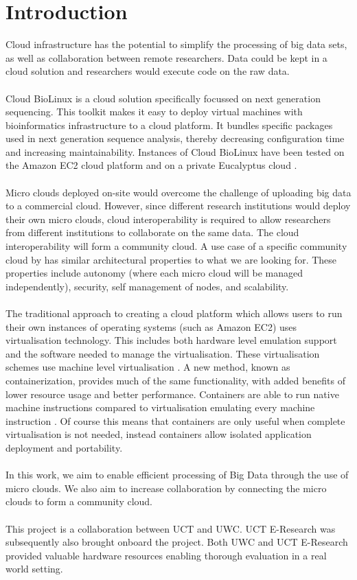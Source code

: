 \documentclass{sig-alternate-05-2015}
\begin{document}
\section{Introduction}
Cloud infrastructure has the potential to simplify the processing of big data sets, as well as collaboration between remote researchers. Data could be kept in a cloud solution and researchers would execute code on the raw data.
\\
\\
Cloud BioLinux is a cloud solution specifically focussed on next generation sequencing. This toolkit makes it easy to deploy virtual machines with bioinformatics infrastructure to a cloud platform. It bundles specific packages used in next generation sequence analysis, thereby decreasing configuration time and increasing maintainability. Instances of Cloud BioLinux have been tested on the Amazon EC2 cloud platform and on a private Eucalyptus cloud \cite{krampis2012cloud}.
\\
\\
Micro clouds deployed on-site would overcome the challenge of uploading big data to a commercial cloud. However, since different research institutions would deploy their own micro clouds, cloud interoperability is required to allow researchers from different institutions to collaborate on the same data. The cloud interoperability will form a community cloud. A use case of a specific community cloud  by \cite{jimenez2014deploying} has similar architectural properties to what we are looking for. These properties include autonomy (where each micro cloud will be managed independently), security, self management of nodes, and scalability.
\\
\\
The traditional approach to creating a cloud platform which allows users to run their own instances of operating systems (such as Amazon EC2) uses virtualisation technology. This includes both hardware level emulation support and the software needed to manage the virtualisation. These virtualisation schemes use machine level virtualisation \cite{fink2014docker}. A new method, known as containerization, provides much of the same functionality, with added benefits of lower resource usage and better performance. Containers are able to run native machine instructions compared to virtualisation emulating every machine instruction \cite{dua2014virtualization}. Of course this means that containers are only useful when complete virtualisation is not needed, instead containers allow isolated application deployment and portability.
\\\\
In this work, we aim to enable efficient processing of Big Data through the use of micro clouds. We also aim to increase collaboration by connecting the micro clouds to form a community cloud.
\\\\
This project is a collaboration between UCT and UWC. UCT E-Research was subsequently also brought onboard the project. Both UWC and UCT E-Research provided valuable hardware resources enabling thorough evaluation in a real world setting.
\end{document}
